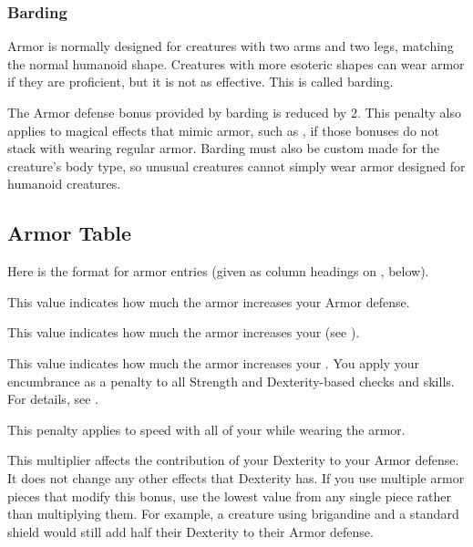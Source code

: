         \subsubsection{Barding}\label{Barding}
            Armor is normally designed for creatures with two arms and two legs, matching the normal humanoid shape.
            Creatures with more esoteric shapes can wear armor if they are proficient, but it is not as effective.
            This is called barding.

            The Armor defense bonus provided by barding is reduced by 2.
            This penalty also applies to magical effects that mimic armor, such as , if those bonuses do not stack with wearing regular armor.
            Barding must also be custom made for the creature's body type, so unusual creatures cannot simply wear armor designed for humanoid creatures.

    \subsection{Armor Table}
        \par Here is the format for armor entries (given as column headings on , below).

         This value indicates how much the armor increases your Armor defense.

         This value indicates how much the armor increases your  (see ).

         This value indicates how much the armor increases your .
        You apply your encumbrance as a penalty to all Strength and Dexterity-based checks and skills.
        For details, see .

         This penalty applies to speed with all of your  while wearing the armor.

         This multiplier affects the contribution of your Dexterity to your Armor defense.
        It does not change any other effects that Dexterity has.
        If you use multiple armor pieces that modify this bonus, use the lowest value from any single piece rather than multiplying them.
        For example, a creature using brigandine and a standard shield would still add half their Dexterity to their Armor defense.

